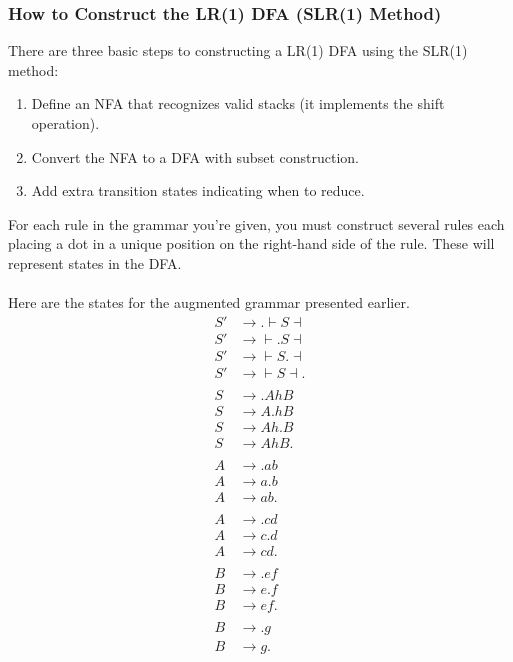 \documentclass[]{article}
\theoremstyle{definition}
\begin{document}
			\subsubsection{How to Construct the LR(1) DFA (SLR(1) Method)}
				There are three basic steps to constructing a LR(1) DFA using the SLR(1) method:
				\begin{enumerate}
					\item Define an NFA that recognizes valid stacks (it implements the shift operation).
					\item Convert the NFA to a DFA with subset construction.
					\item Add extra transition states indicating when to reduce.
				\end{enumerate}

				For each rule in the grammar you're given, you must construct several rules each placing a dot in a unique position on the right-hand side of the rule. These will represent states in the DFA. 
				\\ \\
				Here are the states for the augmented grammar presented earlier.
				\begin{align*}
					S' &\to . \vdash S \dashv \\
					S' &\to{} \vdash . S \dashv \\
					S' &\to{} \vdash S . \dashv \\
					S' &\to{} \vdash S \dashv .
					\\ \\
					S &\to .AhB \\
					S &\to A.hB \\
					S &\to Ah.B \\
					S &\to AhB.
					\\ \\
					A &\to .ab \\
					A &\to a.b \\
					A &\to ab.
					\\ \\
					A &\to .cd \\
					A &\to c.d \\
					A &\to cd.
					\\ \\
					B &\to .ef \\
					B &\to e.f \\
					B &\to ef.
					\\ \\
					B &\to .g \\
					B &\to g.
				\end{align*}
\end{document}
